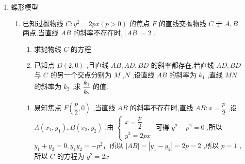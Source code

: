 \begin{enumerate}
\begin{enumerate}
        \item  已知抛物线 $C : {y}^{2} = {2px}\left( {p > 0}\right)$ 的焦点为 $F$ ,过 $F$ 作斜率为 $\sqrt{5}$ 的直线 $l$ 与 $C$ 交于 $M,N$ 两点，若线段 ${MN}$ 中点的纵坐标为 $\sqrt{10}$ ,则 $F$ 到 $C$ 的准线的距离为
        \begin{jieda}
            设 $M\left( {{x}_{1},{y}_{1}}\right) ,N\left( {{x}_{2},{y}_{2}}\right)$，则 $\left\{ \begin{array}{l}
                 {y}_{1}^{2} = {2p}{x}_{1}  \\
                 {y}_{2}^{2} = {2p}{x}_{2}
            \end{array} \right. $，两式相减得 ${y}_{1}^{2} - {y}_{2}^{2} = {2p}{x}_{1} - {2p}{x}_{2}$，即 $\left( {{y}_{1} - {y}_{2}}\right) \left( {{y}_{1} + {y}_{2}}\right)  = {2p}\left( {{x}_{1} - {x}_{2}}\right)$
            
            因为 $M,N$ 两点在斜率为 $\sqrt{5}$ 的直线 $l$ 上，所以 $\dfrac{{y}_{1} - {y}_{2}}{{x}_{1} - {x}_{2}} = \sqrt{5}$，所以由 $\left( {{y}_{1} - {y}_{2}}\right) \left( {{y}_{1} + {y}_{2}}\right)  = {2p}\left( {{x}_{1} - {x}_{2}}\right)$ 得 $\sqrt{5}\left( {{y}_{1} + {y}_{2}}\right)  = {2p}$，因为线段 ${MN}$ 中点的纵坐标为 $\sqrt{10}$，所以 ${y}_{1} + {y}_{2} = 2\sqrt{10}$，则 $\sqrt{5} \times  2\sqrt{10} = {2p},p = 5\sqrt{2}$，所以 $F$ 到 $C$ 的准线的距离为 $5\sqrt{2}$ .
        \end{jieda} 
    \end{enumerate}
    \item 蝶形模型
    \begin{enumerate}
        \item 已知过抛物线 $C : {y}^{2} = {2px}\left( {p > 0}\right)$ 的焦点 $F$ 的直线交抛物线 $C$ 于 $A,B$ 两点,当直线 ${AB}$ 的斜率不存在时, $\left| {AB}\right|  = 2$ .
        \begin{enumerate}
            \item 求抛物线 $C$ 的方程
            \item 已知点 $D\left( {2,0}\right)$ ,且直线 ${AB},{AD},{BD}$ 的斜率都存在,若直线 ${AD},{BD}$ 与 $C$ 的另一个交点分别为 $M$ ,$N$ ,设直线 ${AB}$ 的斜率为 ${k}_{1}$ ,直线 ${MN}$ 的斜率为 ${k}_{2}$ ,求 $\dfrac{{k}_{1}}{{k}_{2}}$ 的值.
        \end{enumerate}
        \begin{jieda}
            \begin{enumerate}
                \item 易知焦点 $F\left( {\dfrac{p}{2},0}\right)$ ,当直线 ${AB}$ 的斜率不存在时,直线 ${AB} : x = \dfrac{p}{2}$ ,设 $A\left( {{x}_{1},{y}_{1}}\right) ,B\left( {{x}_{2},{y}_{2}}\right)$ ,由 $\left\{  \begin{array}{l} x = \dfrac{p}{2} \\  {y}^{2} = {2px} \end{array}\right.$ 可得 ${y}^{2} - {p}^{2} = 0$ ,所以 ${y}_{1} + {y}_{2} = 0,{y}_{1}{y}_{2} =  - {p}^{2}$，所以 $\left| {AB}\right|  = \left| {{y}_{1} - {y}_{2}}\right|  = {2p} = 2$ ,所以 $p = 1$ ,所以 $C$ 的方程为 ${y}^{2} = {2x}$ 
                

\end{enumerate}
\end{jieda}
\end{enumerate}
\end{enumerate}
